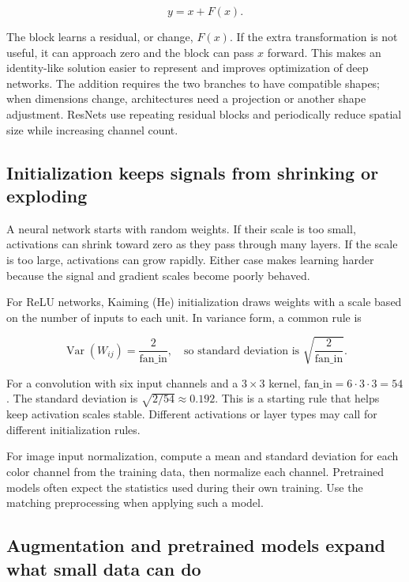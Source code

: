 \[y=x+F(x).\]

The block learns a residual, or change, \(F(x)\). If the extra transformation is not useful, it can approach zero and the block can pass \(x\) forward. This makes an identity-like solution easier to represent and improves optimization of deep networks. The addition requires the two branches to have compatible shapes; when dimensions change, architectures need a projection or another shape adjustment. ResNets use repeating residual blocks and periodically reduce spatial size while increasing channel count.

\subsection{Initialization keeps signals from shrinking or exploding}\label{04-visual-computing-ii-ch031-initialization-keeps-signals-from-shrinking-or-exploding}

\hypertarget{04-visual-computing-ii-ch031-initialization-keeps-signals-from-shrinking-or-exploding}{}

A neural network starts with random weights. If their scale is too small, activations can shrink toward zero as they pass through many layers. If the scale is too large, activations can grow rapidly. Either case makes learning harder because the signal and gradient scales become poorly behaved.

For ReLU networks, Kaiming (He) initialization draws weights with a scale based on the number of inputs to each unit. In variance form, a common rule is

\[\operatorname{Var}(W_{ij})=\frac{2}{\text{fan\_in}}, \quad\text{so standard deviation is }\sqrt{\frac{2}{\text{fan\_in}}}.\]

For a convolution with six input channels and a \(3\times3\) kernel, \(\text{fan\_in}=6\cdot3\cdot3=54\). The standard deviation is \(\sqrt{2/54}\approx0.192\). This is a starting rule that helps keep activation scales stable. Different activations or layer types may call for different initialization rules.

For image input normalization, compute a mean and standard deviation for each color channel from the training data, then normalize each channel. Pretrained models often expect the statistics used during their own training. Use the matching preprocessing when applying such a model.

\subsection{Augmentation and pretrained models expand what small data can do}\label{04-visual-computing-ii-ch031-augmentation-and-pretrained-models-expand-what-small-data-can-do}


